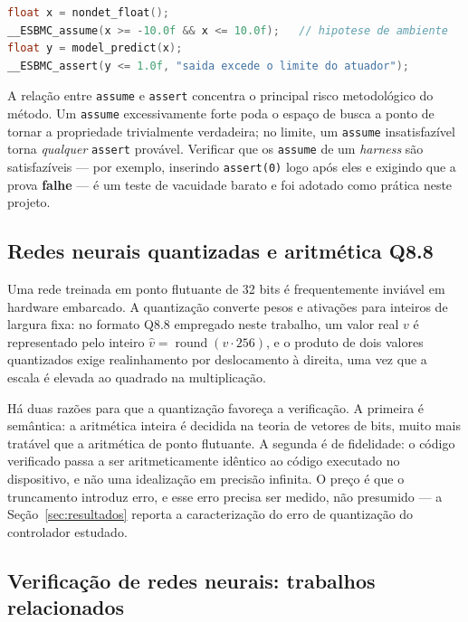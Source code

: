 \begin{lstlisting}[language=C,caption={Padrão de modelagem empregado nos \textit{harnesses}.},label={lst:primitivas}]
float x = nondet_float();
__ESBMC_assume(x >= -10.0f && x <= 10.0f);   // hipotese de ambiente
float y = model_predict(x);
__ESBMC_assert(y <= 1.0f, "saida excede o limite do atuador");
\end{lstlisting}

A relação entre \texttt{assume} e \texttt{assert} concentra o principal risco metodológico do
método. Um \texttt{assume} excessivamente forte poda o espaço de busca a ponto de tornar a
propriedade trivialmente verdadeira; no limite, um \texttt{assume} insatisfazível torna
\emph{qualquer} \texttt{assert} provável. Verificar que os \texttt{assume} de um
\textit{harness} são satisfazíveis --- por exemplo, inserindo \texttt{assert(0)} logo após
eles e exigindo que a prova \textbf{falhe} --- é um teste de vacuidade barato e foi adotado
como prática neste projeto.

\subsection{Redes neurais quantizadas e aritmética Q8.8}

Uma rede treinada em ponto flutuante de 32 bits é frequentemente inviável em hardware
embarcado. A quantização converte pesos e ativações para inteiros de largura fixa: no formato
Q8.8 empregado neste trabalho, um valor real $v$ é representado pelo inteiro
$\hat{v} = \operatorname{round}(v \cdot 256)$, e o produto de dois valores quantizados exige
realinhamento por deslocamento à direita, uma vez que a escala é elevada ao quadrado na
multiplicação.

Há duas razões para que a quantização favoreça a verificação. A primeira é semântica: a
aritmética inteira é decidida na teoria de vetores de bits, muito mais tratável que a
aritmética de ponto flutuante. A segunda é de fidelidade: o código verificado passa a ser
aritmeticamente idêntico ao código executado no dispositivo, e não uma idealização em
precisão infinita. O preço é que o truncamento introduz erro, e esse erro precisa ser
medido, não presumido --- a Seção~\ref{sec:resultados} reporta a caracterização do erro de
quantização do controlador estudado.

\subsection{Verificação de redes neurais: trabalhos relacionados}

